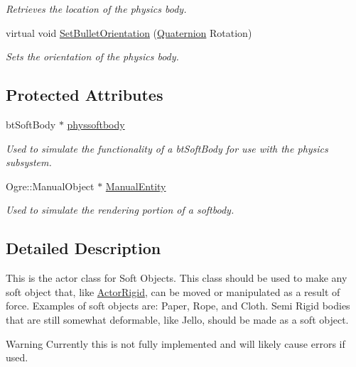\begin{DoxyCompactItemize}
\begin{DoxyCompactList}\small\item\em Retrieves the location of the physics body. \item\end{DoxyCompactList}\item 
virtual void \hyperlink{classphys_1_1ActorSoft_a4a1119b6e42ff11784673657e7d62c1f}{SetBulletOrientation} (\hyperlink{classphys_1_1Quaternion}{Quaternion} Rotation)
\begin{DoxyCompactList}\small\item\em Sets the orientation of the physics body. \item\end{DoxyCompactList}\end{DoxyCompactItemize}
\subsection*{Protected Attributes}
\begin{DoxyCompactItemize}
\item 
\hypertarget{classphys_1_1ActorSoft_ab3b2c8e1f94dff3e3244a5024595afef}{
btSoftBody $\ast$ \hyperlink{classphys_1_1ActorSoft_ab3b2c8e1f94dff3e3244a5024595afef}{physsoftbody}}
\label{d4/d23/classphys_1_1ActorSoft_ab3b2c8e1f94dff3e3244a5024595afef}

\begin{DoxyCompactList}\small\item\em Used to simulate the functionality of a btSoftBody for use with the physics subsystem. \item\end{DoxyCompactList}\item 
\hypertarget{classphys_1_1ActorSoft_abe0900674a3a46883a7d52d9d7a8070f}{
Ogre::ManualObject $\ast$ \hyperlink{classphys_1_1ActorSoft_abe0900674a3a46883a7d52d9d7a8070f}{ManualEntity}}
\label{d4/d23/classphys_1_1ActorSoft_abe0900674a3a46883a7d52d9d7a8070f}

\begin{DoxyCompactList}\small\item\em Used to simulate the rendering portion of a softbody. \item\end{DoxyCompactList}\end{DoxyCompactItemize}


\subsection{Detailed Description}
This is the actor class for Soft Objects. This class should be used to make any soft object that, like \hyperlink{classphys_1_1ActorRigid}{ActorRigid}, can be moved or manipulated as a result of force. Examples of soft objects are: Paper, Rope, and Cloth. Semi Rigid bodies that are still somewhat deformable, like Jello, should be made as a soft object. \begin{DoxyWarning}{Warning}
Currently this is not fully implemented and will likely cause errors if used. 
\end{DoxyWarning}


